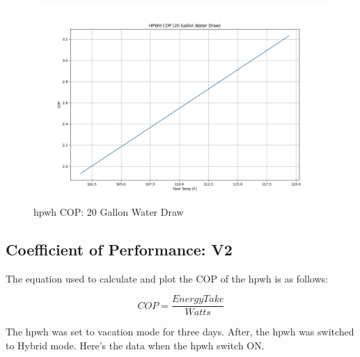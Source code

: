 \begin{figure}[htp!]
    \centering
    \includegraphics[width=0.9\columnwidth]{Pictures/cop_sim.png}
    \caption{\gls{hpwh} COP: 20 Gallon Water Draw}
    \label{fig:cop}
\end{figure}
\newpage
\subsection{Coefficient of Performance: V2}
The equation used to calculate and plot the COP of the \gls{hpwh} is as follows:

\begin{equation}
    COP = \frac{EnergyTake}{Watts}
\end{equation}

The \gls{hpwh} was set to vacation mode for three days. After, the \gls{hpwh} was switched to Hybrid mode. Here's the data when the \gls{hpwh} switch ON.


